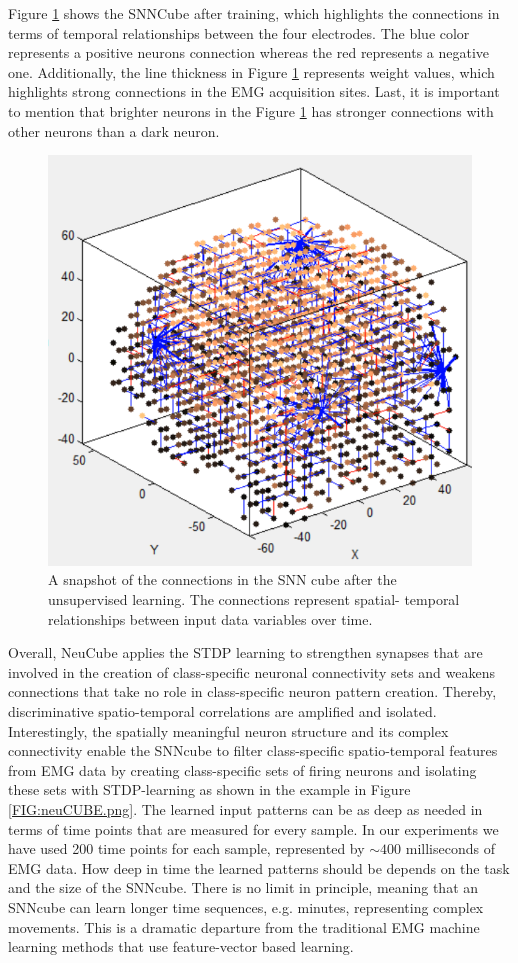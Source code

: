\documentclass[journal,article,submit,moreauthors,pdftex,10pt,a4paper]{Definitions/mdpi}
\begin{document}
Figure \ref{FIG:cube_tr.png} shows the SNNCube after training, which highlights the connections in terms of temporal relationships between the four electrodes. The blue color represents a positive neurons connection whereas the red represents a negative one. Additionally, the line thickness in Figure \ref{FIG:cube_tr.png} represents weight values, which highlights strong connections in the EMG acquisition sites. Last, it is important to mention that brighter neurons in the Figure \ref{FIG:cube_tr.png}  has stronger connections with other neurons than a dark neuron.
\begin{figure}[H]
    \centering
    \includegraphics [width=0.55\linewidth]{cube-tr.png}
    \caption{A snapshot of the connections in the SNN cube after the unsupervised learning. The connections represent spatial-
temporal relationships between input data variables over time.
}
    \label{FIG:cube_tr.png}
\end{figure}
Overall, NeuCube applies the STDP learning to strengthen synapses that are involved in the creation of class-specific neuronal connectivity sets and weakens connections that take no role in class-specific neuron pattern creation. Thereby, discriminative spatio-temporal correlations are amplified and isolated. Interestingly, the spatially meaningful neuron structure and its complex connectivity enable the SNNcube to filter class-specific spatio-temporal features from EMG data by creating class-specific sets of firing neurons and isolating these sets with STDP-learning as shown in the example in Figure \ref{FIG:neuCUBE.png}. The learned input patterns can be as deep as needed in terms of time points that are measured for every sample. In our experiments we have used 200 time points for each sample, represented by $\sim 400$ milliseconds of EMG data. How deep in time the learned patterns should be depends on the task and the size of the SNNcube. There is no limit in principle, meaning that an SNNcube can learn longer time sequences, e.g. minutes, representing complex movements. This is a dramatic departure from the traditional EMG machine learning methods that use feature-vector based learning.        
\end{document}
